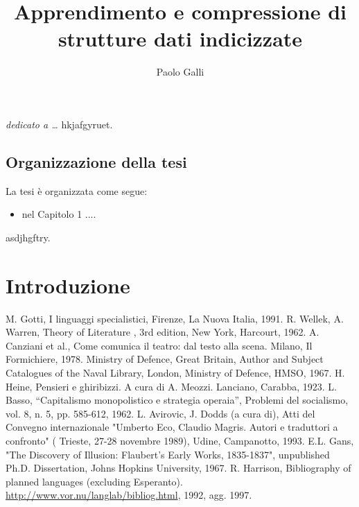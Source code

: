 \documentclass[12pt]{report}
\begin{document}
\title{Apprendimento e compressione di strutture dati indicizzate}
\author{Paolo Galli}
%
% 
%
\beforepreface
\prefacesection{}
        {\hfill \Large {\sl dedicato a \dots}}
% 
%
hkjafgyruet.
%
%
\section*{Organizzazione della tesi}
\label{organizzazione}
La tesi \`e organizzata come segue:
\begin{itemize}
\item nel Capitolo 1 ....
\end{itemize}
%
%
asdjhgftry.
\afterpreface
% 
% 
\chapter{Introduzione}
\label{cap1}
%
%

%
%
\begin{thebibliography}{00}
%
M. Gotti, I linguaggi specialistici, Firenze, La Nuova Italia, 1991.
%
R. Wellek, A. Warren, Theory of Literature , 3rd edition, New York, Harcourt, 1962.
%
A. Canziani et al., Come comunica il teatro: dal testo alla scena. Milano, Il Formichiere, 1978.
%
Ministry of Defence, Great Britain, Author and Subject Catalogues of the Naval Library, London, Ministry of Defence, HMSO, 1967.
%
H. Heine, Pensieri e ghiribizzi. A cura di A. Meozzi. Lanciano, Carabba, 1923.
%
L. Basso, ``Capitalismo monopolistico e strategia operaia'', Problemi del socialismo, vol. 8, n. 5, pp. 585-612, 1962.
%
L. Avirovic, J. Dodds (a cura di), Atti del Convegno internazionale "Umberto Eco, Claudio Magris. Autori e traduttori a confronto" ( Trieste, 27-28 novembre 1989), Udine, Campanotto, 1993.
%
E.L. Gans, "The Discovery of Illusion: Flaubert's Early Works, 1835-1837", unpublished Ph.D. Dissertation, Johns Hopkins University, 1967.
%
R. Harrison, Bibliography of planned languages (excluding Esperanto).  \url{http://www.vor.nu/langlab/bibliog.html}, 1992, agg. 1997.
%
\end{thebibliography}
% 
\end{document}
